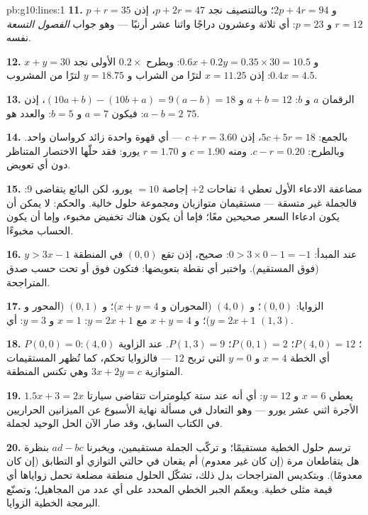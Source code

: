 \begin{solution}{pb:g10:lines:1}
\textbf{11.} $p + r = 35$ و $2p + 4r = 94$؛ وبالتنصيف نجد
$p + 2r = 47$، إذن $r = 12$ و $p = 23$: أي ثلاثة وعشرون دراجًا
واثنا عشر أرنبًا --- وهو جواب \emph{الفصول التسعة} نفسه.

\textbf{12.} $x + y = 30$ و $0.6x + 0.2y = 0.35 \times 30 =
10.5$: وبطرح $0.2 \times$ الأولى نجد $0.4x = 4.5$:
إذن $x = 11.25$ لترًا من الشراب و $y = 18.75$ لترًا من المشروب.

\textbf{13.} الرقمان $a$ و $b$: $a + b = 12$ و
$(10a + b) - (10b + a) = 9(a - b) = 18$، إذن $a - b = 2$:
فيكون $a = 7$ و $b = 5$: والعدد هو $75$.

\textbf{14.} بالجمع: $5c + 5r = 18$، إذن $c + r = 3.60$ --- أي
قهوة واحدة زائد كرواسان واحد. وبالطرح: $c - r = 0.20$. ومنه
$c = 1.90$ و $r = 1.70$ يورو: فقد حلّها الاختصار المتناظر
دون أي تعويض.

\textbf{15.} مضاعفة الادعاء الأول تعطي $4$ تفاحات $+ 2$
إجاصة $= 10$ يورو، لكن البائع يتقاضى $9$: فالجملة
غير متسقة --- مستقيمان متوازيان ومجموعة حلول خالية. والحكم:
لا يمكن أن يكون ادعاءا السعر صحيحين معًا؛ فإما أن يكون هناك تخفيض
مخبوء، وإما أن يكون الحساب مخبوءًا.

\textbf{16.} عند المبدأ: $0 > 3 \times 0 - 1 = -1$: صحيح،
إذن تقع $(0,0)$ في المنطقة $y > 3x - 1$ (فوق المستقيم).
واختبر أي نقطة بتعويضها: فتكون فوق أو تحت حسب
صدق المتراجحة.

\textbf{17.} الزوايا: $(0, 0)$؛ و $(4, 0)$ (المحوران و
$x + y = 4$)؛ و $(0, 1)$ (المحور و $y = 2x + 1$)؛ و
 $x + y = 4$ مع $y = 2x + 1$: $x = 1$ و $y = 3$: أي $(1, 3)$.

\textbf{18.} $P(0,0) = 0$؛ $P(4, 0) = 12$؛ $P(0, 1) = 2$؛
$P(1, 3) = 9$.  عند الزاوية $(4, 0)$: أي الخطة
$x = 4$ و $y = 0$ التي تربح $12$ --- فالزوايا تحكم، كما تُظهر
المستقيمات المتوازية $3x + 2y = c$ وهي تكنس المنطقة.

\textbf{19.} $1.5x + 3 = 2x$ يعطي $x = 6$ و $y = 12$: أي أنه عند ستة
كيلومترات تتقاضى سيارتا الأجرة اثني عشر يورو --- وهو 
التعادل في مسألة نهاية الأسبوع عن الميزانين الحراريين في الكتاب السابق، وقد صار الآن الحل الوحيد
لجملة.

\textbf{20.} ترسم حلول  الخطية مستقيمًا؛ و
تركّب الجملة مستقيمين، ويخبرنا $ad - bc$ بنظرة
هل يتقاطعان مرة (إن كان غير معدوم) أم يقعان في حالتي
التوازي أو التطابق (إن كان معدومًا). وبتكديس المتراجحات
بدل ذلك، تشكّل الحلول منطقة مضلعة تحمل زواياها
أي قيمة مثلى خطية. ويعمّم الجبر الخطي
المحدد على أي عدد من المجاهيل؛ وتصنّع البرمجة الخطية الزوايا.
\end{solution}
